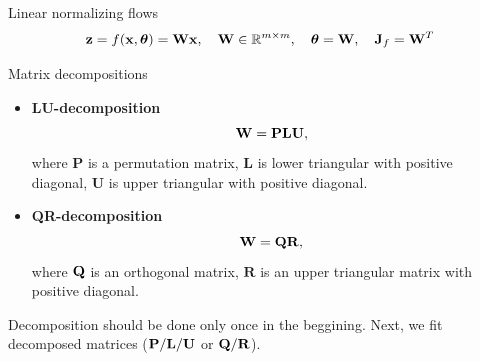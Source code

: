 \begin{frame}{Linear normalizing flows}
	\vspace{-0.5cm}
	\[
		\mathbf{z} = f(\mathbf{x}, \boldsymbol{\theta}) = \mathbf{W} \mathbf{x}, \quad \mathbf{W} \in \mathbb{R}^{m \times m}, \quad \boldsymbol{\theta} = \mathbf{W}, \quad \mathbf{J}_f = \mathbf{W}^T
	\]
	\vspace{-0.7cm}
	\begin{block}{Matrix decompositions}
		\begin{itemize}
			\item \textbf{LU-decomposition}
			\[
				\mathbf{W} = \mathbf{P} \mathbf{L} \mathbf{U},
			\]
			where $\mathbf{P}$ is a permutation matrix, $\mathbf{L}$ is lower triangular with positive diagonal, $\mathbf{U}$ is upper triangular with positive diagonal.
			\item \textbf{QR-decomposition}
			\[
				\mathbf{W} = \mathbf{Q} \mathbf{R},
			\]
			where $\mathbf{Q}$ is an orthogonal matrix, $\mathbf{R}$ is an upper triangular matrix with positive diagonal.
		\end{itemize}
	\end{block}

	Decomposition should be done only once in the beggining. Next, we fit decomposed matrices ($\mathbf{P}/\mathbf{L}/\mathbf{U}$ or $\mathbf{Q}/\mathbf{R}$).

\end{frame}
